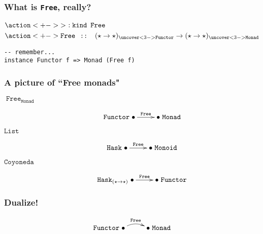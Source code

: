 \documentclass[pdf]{beamer}
\renewcommand{\to}{\ensuremath{\rightarrow}}
\DeclareMathOperator{\Free}{\texttt{Free}}
\DeclareMathOperator{\Monad}{\texttt{Monad}}
\DeclareMathOperator{\Functor}{\texttt{Functor}}
\DeclareMathOperator{\ty}{\texttt{ :: }}
\begin{document}
\begin{frame}[fragile]
  \frametitle{What is \texttt{Free}, really?}
  

  \begin{align*}
    & \action<+->{\mathtt{>}\ \mathtt{:kind}\ \Free} \\
    & \action<+->{
        \Free \ty 
          (\star \to \star)_{\uncover<3->{\Functor}} \to
          (\star \to \star)_{\uncover<3->{\Monad}}
      }
  \end{align*}
  
  \pause

  \begin{tcolorbox}[boxrule=0pt, arc=0pt, outer arc=0pt]
\begin{lstlisting}
-- remember...
instance Functor f => Monad (Free f)
\end{lstlisting}
  \end{tcolorbox}
\end{frame}


\begin{frame}
  \frametitle{A picture of ``Free monads"}
  \begin{description}
  \item[$\Free_{\Monad}$] 
    \begin{displaymath}
      \mathtt{Functor}\xymatrix{\bullet \ar[r]^{\Free} & \bullet}\mathtt{Monad}
    \end{displaymath}
  \pause
  \item[$\mathtt{List}$]
    \begin{displaymath}
      \mathtt{Hask}\xymatrix{\bullet \ar[r]^{\Free} & \bullet}\mathtt{Monoid}
    \end{displaymath}
  \pause
  \item[$\mathtt{Coyoneda}$] 
    \begin{displaymath}
      \mathtt{Hask}_{(\star\to\star)} \xymatrix{\bullet \ar[r]^{\Free} & \bullet}\mathtt{Functor}
    \end{displaymath}
  \end{description}
\end{frame}

\begin{frame}
  \frametitle{Dualize!}
  \begin{center}
    \begin{displaymath}
      \mathtt{Functor}
      \xymatrix{
        \bullet \ar@/^/[r]^{\Free} & 
        \bullet
      }
      \mathtt{Monad}
    \end{displaymath}
  \end{center}
\end{frame}
\end{document}
